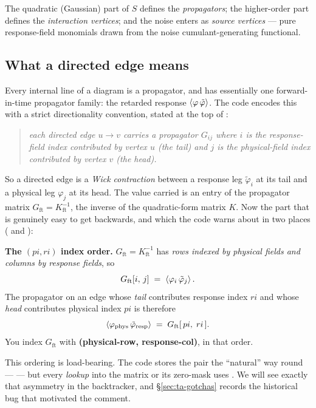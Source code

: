 The quadratic (Gaussian) part of $S$ defines the \emph{propagators}; the
higher-order part defines the \emph{interaction vertices}; and the noise enters
as \emph{source vertices} --- pure response-field monomials drawn from the noise
cumulant-generating functional.

\subsection{What a directed edge means}

Every internal line of a diagram is a propagator, and \msrjd{} has essentially
one forward-in-time propagator family: the retarded response $\left\langle \varphi\,
\tilde\varphi \right\rangle$. The code encodes this with a strict directionality convention,
stated at the top of :

\begin{quote}\itshape
each directed edge $u\to v$ carries a propagator $G_{ij}$ where $i$ is the
response-field index contributed by vertex $u$ (the tail) and $j$ is the
physical-field index contributed by vertex $v$ (the head).
\end{quote}

So a directed edge is a \emph{Wick contraction} between a response leg
$\tilde\varphi_i$ at its tail and a physical leg $\varphi_j$ at its head. The
value carried is an entry of the propagator matrix
$G_{\mathrm{ft}} = K_{\mathrm{ft}}^{-1}$, the inverse of the quadratic-form matrix
$K$. Now the part that is genuinely easy to get backwards, and which the code
warns about in two places ( and
):

\begin{defn}
\textbf{The $(pi, ri)$ index order.}
$G_{\mathrm{ft}} = K_{\mathrm{ft}}^{-1}$ has \emph{rows indexed by physical fields
and columns by response fields}, so
\[
  G_{\mathrm{ft}}[i,\,j] \;=\; \left\langle \varphi_i\,\tilde\varphi_j \right\rangle.
\]
The propagator on an edge whose \emph{tail} contributes response index $ri$ and
whose \emph{head} contributes physical index $pi$ is therefore
\[
  \left\langle \varphi_{\mathrm{phys}}\,\tilde\varphi_{\mathrm{resp}} \right\rangle
  \;=\; G_{\mathrm{ft}}[\,pi,\; ri\,].
\]
You index $G_{\mathrm{ft}}$ with \textbf{(physical-row, response-col)}, in that
order.
\end{defn}

This ordering is load-bearing. The code stores the pair the ``natural'' way
round ---  --- but every \emph{lookup}
into the matrix or its zero-mask uses . We will see exactly that
asymmetry in the backtracker, and \S\ref{sec:ta-gotchas} records the historical
bug that motivated the comment.

